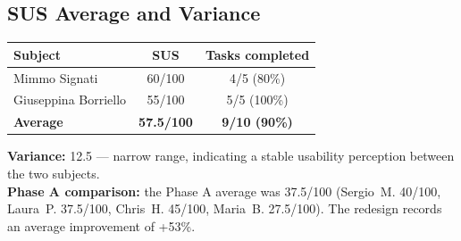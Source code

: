 ﻿\documentclass[11pt,a4paper]{article}
\begin{document}
\vspace{0.2cm}

\subsection*{SUS Average and Variance}
\begin{tcolorbox}[base]
\begin{center}
\begin{tabular}{lcc}
\toprule
\textbf{Subject} & \textbf{SUS} & \textbf{Tasks completed} \\
\midrule
Mimmo Signati & 60/100 & 4/5 (80\%) \\
Giuseppina Borriello & 55/100 & 5/5 (100\%) \\
\midrule
\textbf{Average} & \textbf{57.5/100} & \textbf{9/10 (90\%)} \\
\bottomrule
\end{tabular}
\end{center}

\medskip

\noindent\textbf{Variance:} 12.5 --- narrow range,
indicating a stable usability perception between the two subjects.\\[0.2cm]
\textbf{Phase A comparison:} the Phase A average was 37.5/100 (Sergio~M.
40/100, Laura~P. 37.5/100, Chris~H. 45/100, Maria~B. 27.5/100). The
redesign records an average improvement of +53\%.
\end{tcolorbox}

\vspace{0.2cm}
\end{document}
